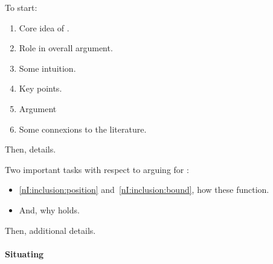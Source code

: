 \begin{note}[Plan]
  To start:
  \begin{enumerate}
  \item Core idea of \nI{}.
  \item Role in overall argument.
  \item Some intuition.
  \item Key points.
  \item Argument
  \item Some connexions to the literature.
  \end{enumerate}
  Then, details.
\end{note}

\begin{note}[Task]
  Two important tasks with respect to arguing for \nI{}:

  \begin{itemize}
  \item \ref{nI:inclusion:position} and~\ref{nI:inclusion:bound}, how these function.
  \item And, why \nI{} holds.
  \end{itemize}

  Then, additional details.
\end{note}

\paragraph{Situating \nI{}}


